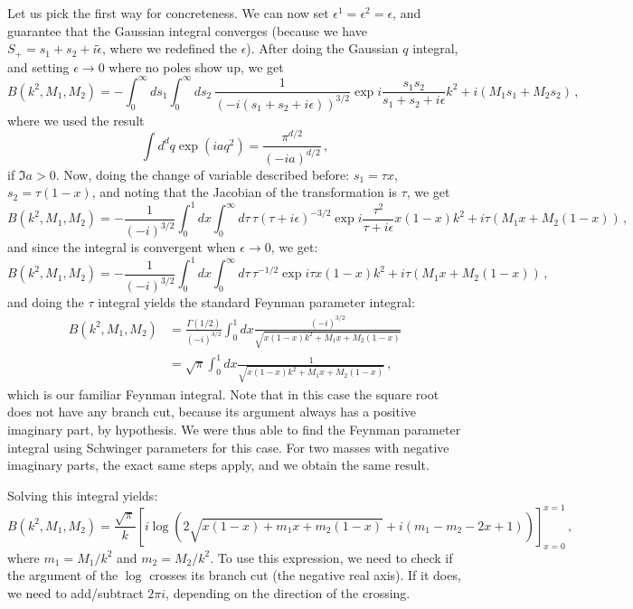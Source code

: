 \documentclass[twoside]{article}
\begin{document}
Let us pick the first way for concreteness.
We can now set $\epsilon^1=\epsilon^2=\epsilon$, and guarantee that the Gaussian integral converges (because we have $S_+ = s_1 + s_2 + i \tilde{\epsilon}$, where we redefined the $\epsilon$).
After doing the Gaussian $q$ integral, and setting $\epsilon \to 0$ where no poles show up, we get
\begin{equation}
B(k^2,M_1,M_2)= - \int_0^\infty ds_1 \int_0^\infty ds_2\,\frac{1}{(- i(s_1+s_2+ i \epsilon))^{3/2}} \exp{i\frac{s_1 s_2}{s_1+s_2+i\epsilon}k^2+ i (M_1 s_1 +M_2 s_2)}\,,
\end{equation}
where we used the result
\begin{equation}
\label{eq:gauss}
\int d^d q \exp(i a q^2) = \frac{\pi^{d/2}}{(-i a)^{d/2}}\,,
\end{equation}
if $\Im a > 0$.
Now, doing the change of variable described before: $s_1 = \tau x$, $s_2 = \tau (1-x)$, and noting that the Jacobian of the transformation is $\tau$, we get
\begin{equation}
B(k^2,M_1,M_2)= - \frac{1}{(- i)^{3/2}} \int_0^1 dx \int_0^\infty d\tau\, \tau (\tau+i \epsilon)^{-3/2}  \exp{i \frac{\tau^2}{\tau+i \epsilon} x (1-x)k^2+ i \tau (M_1 x +M_2 (1-x))}\,,
\end{equation}
and since the integral is convergent when $\epsilon \to 0$, we get:
\begin{equation}
B(k^2,M_1,M_2)= - \frac{1}{(- i)^{3/2}} \int_0^1 dx \int_0^\infty d\tau\, \tau^{-1/2}  \exp{i \tau x (1-x)k^2+ i \tau (M_1 x +M_2 (1-x))}\,,
\end{equation}
and doing the $\tau$ integral yields the standard Feynman parameter integral:
\begin{align}
B(k^2,M_1,M_2)&= \frac{\Gamma(1/2)}{(- i)^{3/2}} \int_0^1 dx \frac{(-i)^{3/2}}{\sqrt{x (1-x)k^2+ M_1 x +M_2 (1-x)}}\\
& = \sqrt{\pi}\int_0^1 dx \frac{1}{\sqrt{x (1-x)k^2+ M_1 x +M_2 (1-x)}} \,, \label{eq:Bsame}
\end{align}
which is our familiar Feynman integral.  
Note that in this case the square root does not have any branch cut, because its argument always has a positive imaginary part, by hypothesis. We were thus able to find the Feynman parameter integral using Schwinger parameters for this case. For two masses with negative imaginary parts, the exact same steps apply, and we obtain the same result.

Solving this integral yields:
\begin{equation}
\label{eq:Bfinalsame}
B(k^2,M_1,M_2) =\frac{\sqrt{\pi}}{k} \left[ i \log \left(2 \sqrt{x (1-x) + m_1 x + m_2 (1-x)}+i (m_1-m_2-2 x+1)\right)\right]_{x=0}^{x=1} \,,
\end{equation}
where $m_1 = M_1/k^2$ and $m_2 = M_2/k^2$. To use this expression, we need to check if the argument of the $\log$ crosses its branch cut (the negative real axis). If it does, we need to add/subtract $2 \pi i$, depending on the direction of the crossing.
\end{document}
